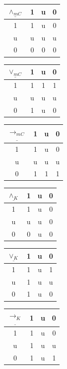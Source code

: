 \documentclass[11pt,a4paper,titlepage]{article}
\theoremstyle{definition}
\newcommand{\3}{\vspace{.3in}}
\newcommand{\2}{\vspace{.2in}}
\newcommand{\1}{\vspace{.1in}}
\newcommand{\5}{\vspace{.05in}}
\begin{document}
\begin{center}
	\begin{tabular}{|c|ccc|}
		\hline
		$\underline{\wedge_{mC}} $ & 1 & u & 0 \\
		\hline
		1 & 1 & u & 0 \\
		u & u & u & u \\
		0 & 0 & 0 & 0 \\
		\hline
	\end{tabular}
	\begin{tabular}{|c|ccc|}
		\hline$\underline{\vee_{mC}} $ & 1 & u & 0 \\\hline
		1 & 1 & 1 & 1 \\
		u & u & u & u \\
		0 & 1 & u & 0 \\\hline
	\end{tabular}
	\begin{tabular}{|c|ccc|}
		\hline
		$\underline{\rightarrow_{mC}} $ & 1 & u & 0 \\
		\hline
		1 & 1 & u & 0 \\
		u & u & u & u \\
		0 & 1 & 1 & 1 \\
		\hline
	\end{tabular}
	\end{center} 
	\begin{center}
	\begin{tabular}{|c|ccc|}
		\hline
		$\underline{\wedge_K} $ & 1 & u & 0 \\
		\hline
		1 & 1 & u & 0 \\
		u & u & u & 0 \\
		0 & 0 & u & 0 \\
		\hline
	\end{tabular}
	\begin{tabular}{|c|ccc|}
		\hline$\underline{\vee_K} $ & 1 & u & 0 \\\hline
		1 & 1 & u & 1 \\
		u & 1 & u & u \\
		0 & 1 & u & 0 \\\hline
	\end{tabular}
	\begin{tabular}{|c|ccc|}
		\hline
		$\underline{\rightarrow_K} $ & 1 & u & 0 \\
		\hline
		1 & 1 & u & 0 \\
		u & 1 & u & u \\
		0 & 1 & u & 1 \\
		\hline
	\end{tabular}
\end{center} 
\end{document}
